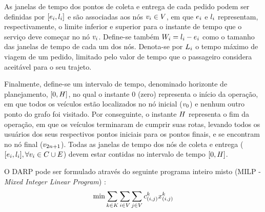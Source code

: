 As janelas de tempo dos pontos de coleta e entrega de cada pedido podem ser
definidas por $[e_{i},l_{i}]$ e são 
associadas aos nós $v_{i} \in V$, em que $e_{i}$ e 
$l_{i}$ representam, respectivamente, o limite inferior e 
superior para o instante de tempo que o serviço deve começar no nó $v_{i}$.
Define-se também $W_{i} = l_{i} 
- e_{i}$ como o tamanho das janelas de tempo 
de cada um dos nós. Denota-se por $L_i$ o tempo máximo de 
viagem de um pedido, limitado pelo valor de tempo que o passageiro considera 
aceitável para o seu trajeto. 

Finalmente, define-se um intervalo de tempo, denominado horizonte de
planejamento, $[0, H]$, no qual o instante $0$ (zero) representa
o início da operação, em que todos os veículos estão localizados no nó inicial 
($v_{0}$) e nenhum outro ponto do grafo foi visitado.
Por conseguinte, o instante $H$ representa o fim da operação, 
em que os veículos terminaram de cumprir suas rotas, levando todos os usuários 
dos seus respectivos pontos iniciais para os pontos finais, e se 
encontram no nó final ($v_{2n + 1}$). Todas as janelas de tempo dos nós de
coleta e entrega ($[e_i, l_i], 
\forall v_{i} \in C \cup E$) devem estar contidas 
no intervalo de tempo $[0, H]$.

O DARP pode ser formulado através do seguinte programa inteiro misto (MILP -
\textit{Mixed Integer Linear Program}) \cite{cordeau_branch-and-cut_2006}: 
\newline
%
\begin{equation} \label{eq:darp_objective}
  \min \sum_{k \in K}
       \sum_{i \in V}
       \sum_{j \in V}
  c_{(i,j)}^{k}
  x_{(i, j)}^{k}
\end{equation}


